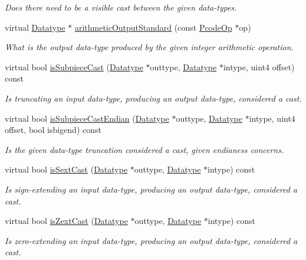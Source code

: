 \begin{DoxyCompactItemize}
\begin{DoxyCompactList}\small\item\em Does there need to be a visible cast between the given data-\/types. \end{DoxyCompactList}\item 
virtual \mbox{\hyperlink{class_datatype}{Datatype}} $\ast$ \mbox{\hyperlink{class_cast_strategy_c_a478423d83d44c4c2d28a461dad75654c}{arithmetic\+Output\+Standard}} (const \mbox{\hyperlink{class_pcode_op}{Pcode\+Op}} $\ast$op)
\begin{DoxyCompactList}\small\item\em What is the output data-\/type produced by the given integer arithmetic operation. \end{DoxyCompactList}\item 
virtual bool \mbox{\hyperlink{class_cast_strategy_c_a24b9433948f1406bfa8503b7d5297415}{is\+Subpiece\+Cast}} (\mbox{\hyperlink{class_datatype}{Datatype}} $\ast$outtype, \mbox{\hyperlink{class_datatype}{Datatype}} $\ast$intype, uint4 offset) const
\begin{DoxyCompactList}\small\item\em Is truncating an input data-\/type, producing an output data-\/type, considered a cast. \end{DoxyCompactList}\item 
virtual bool \mbox{\hyperlink{class_cast_strategy_c_a9fbcb64309ac27837a8da7aa76a6f1f6}{is\+Subpiece\+Cast\+Endian}} (\mbox{\hyperlink{class_datatype}{Datatype}} $\ast$outtype, \mbox{\hyperlink{class_datatype}{Datatype}} $\ast$intype, uint4 offset, bool isbigend) const
\begin{DoxyCompactList}\small\item\em Is the given data-\/type truncation considered a cast, given endianess concerns. \end{DoxyCompactList}\item 
virtual bool \mbox{\hyperlink{class_cast_strategy_c_a626fa032a6c9ff7ab710f8d28586c72e}{is\+Sext\+Cast}} (\mbox{\hyperlink{class_datatype}{Datatype}} $\ast$outtype, \mbox{\hyperlink{class_datatype}{Datatype}} $\ast$intype) const
\begin{DoxyCompactList}\small\item\em Is sign-\/extending an input data-\/type, producing an output data-\/type, considered a cast. \end{DoxyCompactList}\item 
virtual bool \mbox{\hyperlink{class_cast_strategy_c_a5c4b61d624a78a2e6f16bf2902e5b8e6}{is\+Zext\+Cast}} (\mbox{\hyperlink{class_datatype}{Datatype}} $\ast$outtype, \mbox{\hyperlink{class_datatype}{Datatype}} $\ast$intype) const
\begin{DoxyCompactList}\small\item\em Is zero-\/extending an input data-\/type, producing an output data-\/type, considered a cast. \end{DoxyCompactList}\end{DoxyCompactItemize}

